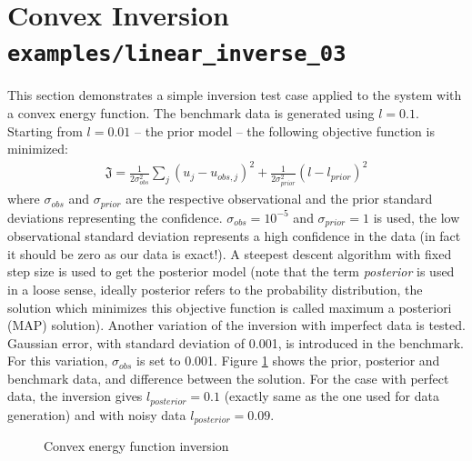 \documentclass[%
notitlepage,
]{revtex4-1}
\begin{document}
\section{Convex Inversion \texttt{examples/linear\_inverse\_03}}
This section demonstrates a simple inversion test case applied to the system with a convex energy function. The benchmark data is generated using $l = 0.1$. Starting from $l = 0.01$ -- the prior model -- the following objective function is minimized:
\begin{eqnarray}
  \mathfrak{J} = \frac{1}{2\sigma_{obs}^2}\sum_{j}(u_j - u_{obs,j})^2 + \frac{1}{2\sigma_{prior}^2}(l - l_{prior})^2
\end{eqnarray}
where $\sigma_{obs}$ and $\sigma_{prior}$ are the respective observational and the prior standard deviations representing the confidence. $\sigma_{obs} = 10^{-5}$ and $\sigma_{prior} = 1$ is used, the low observational standard deviation represents a high confidence in the data (in fact it should be zero as our data is exact!). A steepest descent algorithm with fixed step size is used to get the posterior model (note that the term \textit{posterior} is used in a loose sense, ideally posterior refers to the probability distribution, the solution which minimizes this objective function is called maximum a posteriori (MAP) solution). Another variation of the inversion with imperfect data is tested. Gaussian error, with standard deviation of 0.001, is introduced in the benchmark. For this variation, $\sigma_{obs}$ is set to 0.001. Figure \ref{fig:convex:inverse} shows the prior, posterior and benchmark data, and difference between the solution. For the case with perfect data, the inversion gives $l_{posterior} = 0.1$ (exactly same as the one used for data generation) and with noisy data $l_{posterior} = 0.09$.  

\begin{figure}[!h]
    \caption{Convex energy function inversion}
    \label{fig:convex:inverse}
\end{figure}
\end{document}
